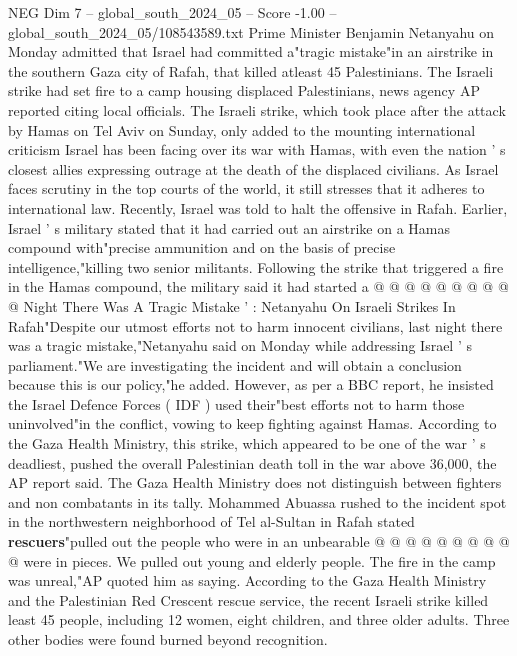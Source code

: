 \begin{textsample}{NEG Dim 7 – global\_south\_2024\_05 – Score -1.00 – global\_south\_2024\_05/108543589.txt}  \label{ex:f7_neg_244}
Prime Minister Benjamin Netanyahu on Monday admitted that Israel had committed a"tragic mistake"in an airstrike in the southern Gaza city of Rafah, that killed atleast 45 Palestinians.
The Israeli strike had set fire to a camp housing displaced Palestinians, news agency AP reported citing local officials.
The Israeli strike, which took place after the attack by Hamas on Tel Aviv on Sunday, only added to the mounting international criticism Israel has been facing over its war with Hamas, with even the nation ' s closest allies expressing outrage at the death of the displaced civilians.
As Israel faces scrutiny in the top courts of the world, it still stresses that it adheres to international law.
Recently, Israel was told to halt the offensive in Rafah.
Earlier, Israel ' s military stated that it had carried out an airstrike on a Hamas compound with"precise ammunition and on the basis of precise intelligence,"killing two senior militants.
Following the strike that triggered a fire in the Hamas compound, the military said it had started a @ @ @ @ @ @ @ @ @ @ Night There Was A Tragic Mistake ' : Netanyahu On Israeli Strikes In Rafah"Despite our utmost efforts not to harm innocent civilians, last night there was a tragic mistake,"Netanyahu said on Monday while addressing Israel ' s parliament."We are investigating the incident and will obtain a conclusion because this is our policy,"he added.
However, as per a BBC report, he insisted the Israel Defence Forces ( IDF ) used their"best efforts not to harm those uninvolved"in the conflict, vowing to keep fighting against Hamas.
According to the Gaza Health Ministry, this strike, which appeared to be one of the war ' s deadliest, pushed the overall Palestinian death toll in the war above 36,000, the AP report said.
The Gaza Health Ministry does not distinguish between fighters and non combatants in its tally.
Mohammed Abuassa rushed to the incident spot in the northwestern neighborhood of Tel al-Sultan in Rafah stated \textbf{rescuers}"pulled out the people who were in an unbearable @ @ @ @ @ @ @ @ @ @ were in pieces.
We pulled out young and elderly people.
The fire in the camp was unreal,"AP quoted him as saying.
According to the Gaza Health Ministry and the Palestinian Red Crescent rescue service, the recent Israeli strike killed least 45 people, including 12 women, eight children, and three older adults.
Three other bodies were found burned beyond recognition.

\end{textsample}
